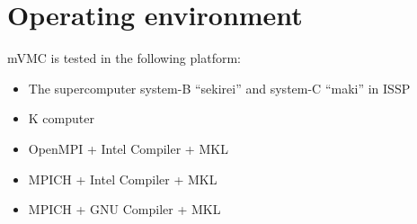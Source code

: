 \section{Operating environment}
mVMC is tested in the following platform:
\begin{itemize}
\item The supercomputer system-B ``sekirei'' and system-C ``maki'' in ISSP
\item K computer
\item OpenMPI + Intel Compiler + MKL
\item MPICH + Intel Compiler + MKL
\item MPICH + GNU Compiler + MKL
\end{itemize}
